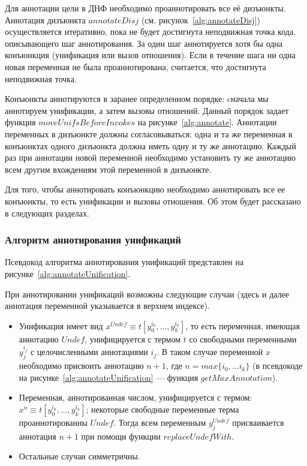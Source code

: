Для аннотации цели в ДНФ необходимо проаннотировать все её дизъюнкты.
Аннотация дизъюнкта $annotateDisj$ (см. рисунок~\ref{alg:annotateDisj}) осуществляется итеративно, пока не будет достигнута неподвижная точка кода, описывающего шаг аннотирования.
За один шаг аннотируется хотя бы одна конъюнкция (унификация или вызов отношения).
Если в течение шага ни одна новая переменная не была проаннотирована, считается, что достигнута неподвижная точка.

Конъюнкты аннотируются в заранее определенном порядке: cначала мы аннотируем унификации, а затем вызовы отношений.
Данный порядок задает функция $moveUnifsBeforeInvokes$ на рисунке~\ref{alg:annotate}.
Аннотации переменных в дизъюнкте должны согласовываться: одна и та же переменная в конъюнктах одного дизъюнкта должна иметь одну и ту же аннотацию.
Каждый раз при аннотации новой переменной необходимо установить ту же аннотацию всем другим вхождениям этой переменной в дизъюнкте.

Для того, чтобы аннотировать конъюнкцию необходимо аннотировать все ее конъюнкты, то есть унификации и вызовы отношения.
Об этом будет рассказано в следующих разделах.

\subsubsection{Алгоритм аннотирования унификаций}

Псевдокод алгоритма аннотирования унификаций представлен на рисунке~\ref{alg:annotateUnification}.

При аннотировании унификаций возможны следующие случаи (здесь и далее аннотация переменной указывается в верхнем индексе).
\begin{itemize}
    \item Унификация имеет вид $x^{Undef} \equiv t[y_0^{i_0}, \dots, y_k^{i_k}]$, то есть переменная, имеющая аннотацию $Undef$, унифицируется с термом $t$ со свободными переменными $y_j^{i_j}$ с целочисленными аннотациями $i_j$. В таком случае переменной $x$ необходимо присвоить аннотацию $n + 1$, где $n = max \{ i_0, \dots i_k\}$ (в псевдокоде на рисунке~\ref{alg:annotateUnification} --- функция $getMaxAnnotation$).
    \item Переменная, аннотированная числом, унифицируется с термом: $x^{n} \equiv t[y_0^{i_0}, \dots, y_k^{i_k}]$; некоторые свободные переменные терма проаннотированны $Undef$.
    Тогда всем переменным $y_j^{Undef}$ присваивается аннотация $n+1$ при помощи функции $replaceUndefWith$.
    \item Остальные случаи симметричны.
\end{itemize}


